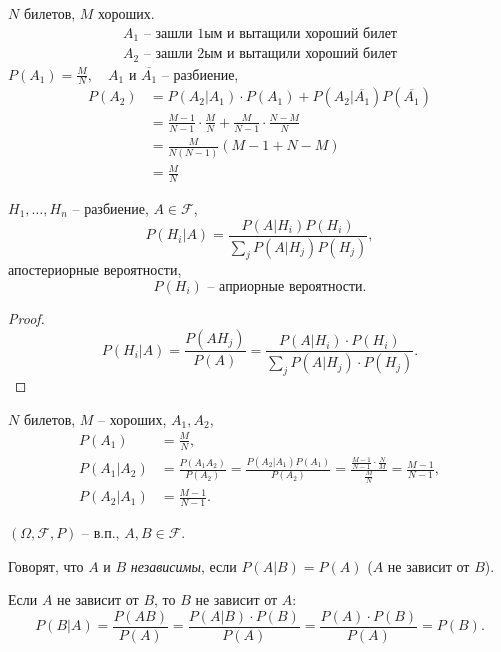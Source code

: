\begin{eg}
  $N$ билетов, $M$ хороших.
  \[
    \begin{array}{l}
      A_1 \text{ -- зашли 1ым и вытащили хороший билет} \\
      A_2 \text{ -- зашли 2ым и вытащили хороший билет}
    \end{array}
  \]
  $P(A_1) = \frac{M}{N}, \quad A_1$ и $\overline{A_1}$ -- разбиение,
  \begin{align*}
    P(A_2) &= P(A_2|A_1)\cdot P(A_1) + P(A_2|\overline{A_1})P(\overline{A_1}) \\
    &= \frac{M-1}{N-1} \cdot \frac{M}{N} + \frac{M}{N-1}\cdot \frac{N-M}{N} \\
    &= \frac{M}{N(N-1)}(M-1+N-M) \\
    &= \frac{M}{N}
  \end{align*}
\end{eg}

\begin{theorem}
  $H_1,\ldots,H_n$ -- разбиение, $A \in \mathcal{F}$,
  \[
    P(H_i|A) = \frac{P(A|H_i)P(H_i)}{\sum_{j}P(A|H_j)P(H_j)},
  \]
  апостериорные вероятности,
  \[
    P(H_i) \text{ -- априорные вероятности}.
  \]
\end{theorem}

\begin{proof}
  \[
    P(H_i|A) = \frac{P(AH_j)}{P(A)} = \frac{P(A|H_i)\cdot P(H_i)}{\sum_{j}P(A|H_j)\cdot P(H_j)}.
  \]
\end{proof}

\begin{eg}
  $N$ билетов, $M$ -- хороших, $A_1,A_2$,
  \begin{align*}
    P(A_1) &= \frac{M}{N}, \\
    P(A_1|A_2) &= \frac{P(A_1A_2)}{P(A_2)} = \frac{P(A_2|A_1)P(A_1)}{P(A_2)} = \frac{\frac{M-1}{N-1}\cdot \frac{N}{M}}{\frac{M}{N}} = \frac{M-1}{N-1}, \\
    P(A_2|A_1) &= \frac{M-1}{N-1}.
  \end{align*}
\end{eg}

\begin{definition}
  $(\Omega,\mathcal{F},P)$ -- в.п., $A,B \in \mathcal{F}$.

  Говорят, что $A$ и $B$ \emph{независимы}, если $P(A|B) = P(A)$ ($A$ не зависит от $B$).
\end{definition}

\begin{remark}
  Если $A$ не зависит от $B$, то $B$ не зависит от $A$:
  \[
    P(B|A) = \frac{P(AB)}{P(A)} = \frac{P(A|B)\cdot P(B)}{P(A)} = \frac{P(A)\cdot P(B)}{P(A)} = P(B).
  \]
\end{remark}

